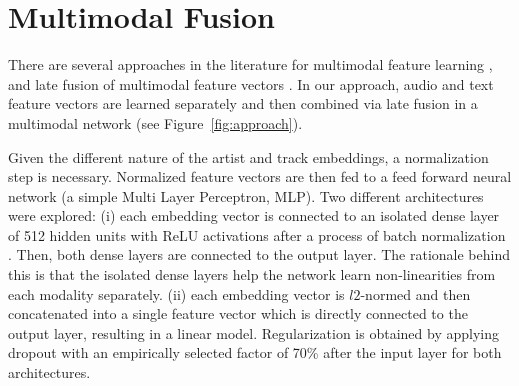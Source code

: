 


\section{Multimodal Fusion}\label{sec:cold-rec:multimodal}

There are several approaches in the literature for multimodal feature learning \cite{ngiam2011multimodal,srivastava2012learning}, and late fusion of multimodal feature vectors \cite{Bechet2015,Slizovskaia2017}. %
In our approach, audio and text feature vectors are learned separately and then combined via late fusion in a multimodal network (see Figure~\ref{fig:approach}).

Given the different nature of the artist and track embeddings, a normalization step is necessary. 
Normalized feature vectors are then fed to a feed forward neural network (a simple Multi Layer Perceptron, MLP). Two different architectures were explored: (i) each embedding vector is connected to an isolated dense layer of 512 hidden units with ReLU activations after a process of batch normalization \cite{IoffeS15}. Then, both dense layers are connected to the output layer. The rationale behind this is that the isolated dense layers help the network learn non-linearities from each modality separately. (ii) each embedding vector is $l2$-normed and then concatenated into a single feature vector which is directly connected to the output layer, resulting in a linear model.
Regularization is obtained by applying dropout with an empirically selected factor of 70\% after the input layer for both architectures.

